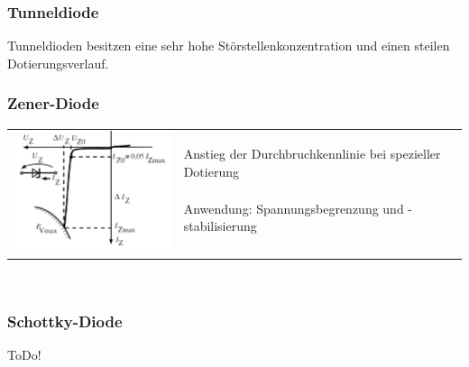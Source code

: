		\subsubsection{Tunneldiode}
			Tunneldioden besitzen eine sehr hohe Störstellenkonzentration und einen
			steilen Dotierungsverlauf. 
			
		\subsubsection{Zener-Diode}
		\begin{tabular}{l l}
			\multirow{5}{*}{
			\includegraphics[width=6cm]{./images/zdiode-kennlinie.png}} & \\
			& Anstieg der Durchbruchkennlinie bei spezieller Dotierung \\
			& Anwendung: Spannungsbegrenzung und -stabilisierung \\ & \\ & \\
		\end{tabular} \\ 
		
		\subsubsection{Schottky-Diode}
			ToDo!
